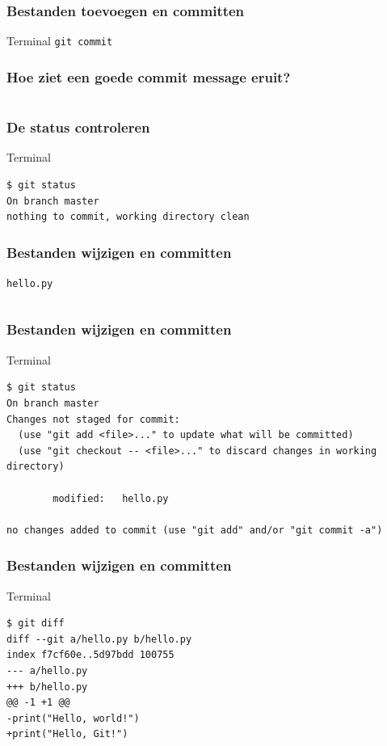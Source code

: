 \documentclass[]{beamer}
\begin{document}
\begin{frame}[fragile]
    \frametitle{Bestanden toevoegen en committen}

    \begin{block}{Terminal}
    \verb/git commit/
    \end{block}
\end{frame}

\begin{frame}[plain]
    \frametitle{Hoe ziet een goede commit message eruit?}

    \inputminted[fontsize=\scriptsize]{text}{source/commit-message.txt}
\end{frame}

\begin{frame}[fragile]
    \frametitle{De status controleren}

    \begin{block}{Terminal}
\begin{Verbatim}[fontsize=\scriptsize]
$ git status
On branch master
nothing to commit, working directory clean
\end{Verbatim}
    \end{block}
\end{frame}

\begin{frame}[fragile]
    \frametitle{Bestanden wijzigen en committen}

    \texttt{hello.py}
    \inputminted[bgcolor=monokaibg]{python}{source/hello2.py}
\end{frame}

\begin{frame}[fragile]
    \frametitle{Bestanden wijzigen en committen}

    \begin{block}{Terminal}
\begin{Verbatim}[fontsize=\tiny]
$ git status
On branch master
Changes not staged for commit:
  (use "git add <file>..." to update what will be committed)
  (use "git checkout -- <file>..." to discard changes in working directory)

        modified:   hello.py

no changes added to commit (use "git add" and/or "git commit -a")
\end{Verbatim}
    \end{block}
\end{frame}

\begin{frame}[fragile]
    \frametitle{Bestanden wijzigen en committen}

    \begin{block}{Terminal}
\begin{Verbatim}[fontsize=\scriptsize]
$ git diff
diff --git a/hello.py b/hello.py
index f7cf60e..5d97bdd 100755
--- a/hello.py
+++ b/hello.py
@@ -1 +1 @@
-print("Hello, world!")
+print("Hello, Git!")
\end{Verbatim}
    \end{block}
\end{frame}
\end{document}

